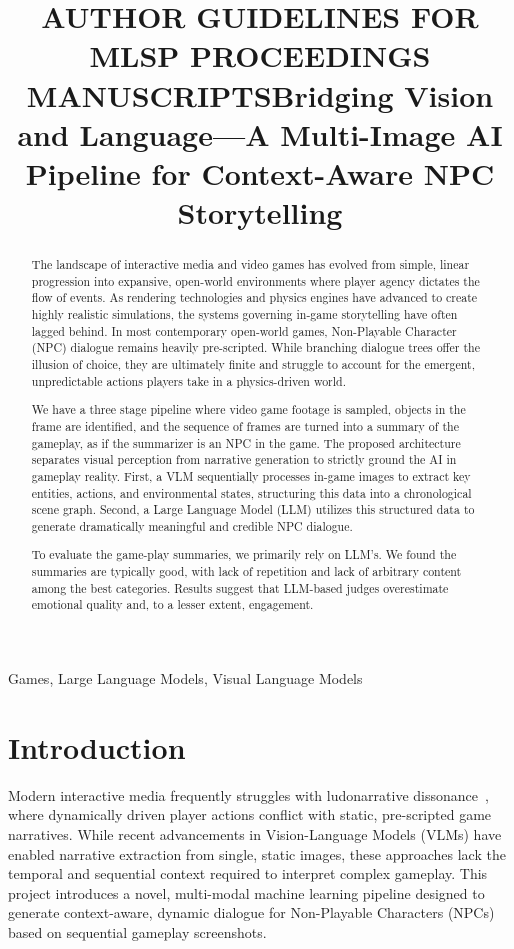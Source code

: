 \documentclass{article}
\title{AUTHOR GUIDELINES FOR MLSP PROCEEDINGS MANUSCRIPTS}
\title{Bridging Vision and Language---A Multi-Image AI Pipeline for Context-Aware NPC Storytelling}
\begin{document}
\maketitle

\begin{abstract}
The landscape of interactive media and video games has evolved from simple, linear progression into expansive, open-world environments where player agency dictates the flow of events. As rendering technologies and physics engines have advanced to create highly realistic simulations, the systems governing in-game storytelling have often lagged behind. In most contemporary open-world games, Non-Playable Character (NPC) dialogue remains heavily pre-scripted. While branching dialogue trees offer the illusion of choice, they are ultimately finite and struggle to account for the emergent, unpredictable actions players take in a physics-driven world.

We have a three stage pipeline where video game footage is sampled, objects
in the frame are identified, and the sequence of frames are turned into
a summary of the gameplay, as if the summarizer is an NPC in the game.
The proposed architecture separates visual perception from narrative generation to strictly ground the AI in gameplay reality. First, a VLM sequentially processes in-game images to extract key entities, actions, and environmental states, structuring this data into a chronological scene graph. Second, a Large Language Model (LLM) utilizes this structured data to generate dramatically meaningful and credible NPC dialogue.

To evaluate the game-play summaries, we primarily rely on LLM's.
We found the summaries are typically good, with lack of repetition and lack of arbitrary content among the best categories.
Results suggest that LLM-based judges overestimate emotional quality and, to a lesser extent, engagement.
\end{abstract}
\begin{keywords}
Games,
Large Language Models, Visual Language Models
\end{keywords}

\section{Introduction}
Modern interactive media frequently struggles with ludonarrative dissonance~\cite{Hocking2007}, where dynamically driven player actions conflict with static, pre-scripted game narratives. While recent advancements in Vision-Language Models (VLMs) have enabled narrative extraction from single, static images, these approaches lack the temporal and sequential context required to interpret complex gameplay. This project introduces a novel, multi-modal machine learning pipeline designed to generate context-aware, dynamic dialogue for Non-Playable Characters (NPCs) based on sequential gameplay screenshots.
\end{document}
